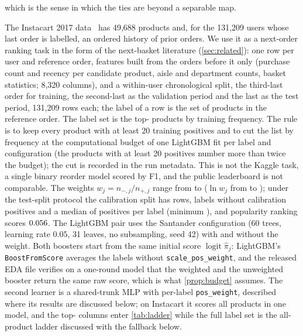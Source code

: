\documentclass[sigconf,nonacm]{acmart}
\begin{document}
which is the sense in which the ties are beyond a separable map.

The Instacart 2017 data~\cite{Instacart2017} has 49,688 products and, for the 131,209 users whose last order is labelled, an ordered history of prior orders. We use it as a next-order ranking task in the form of the next-basket literature (\cref{sec:related}): one row per user and reference order, features built from the orders before it only (purchase count and recency per candidate product, aisle and department counts, basket statistics; 8,320 columns), and a within-user chronological split, the third-last order for training, the second-last as the validation period and the last as the test period, 131,209 rows each; the label of a row is the set of products in the reference order. The label set is the top-\nInLabels{} products by training frequency. The rule is to keep every product with at least 20 training positives and to cut the list by frequency at the computational budget of one LightGBM fit per label and configuration (the products with at least 20 positives number more than twice the budget); the cut is recorded in the run metadata. This is not the Kaggle task, a single binary reorder model scored by F1, and the public leaderboard is not comparable.
The weights $w_j=n_{-,j}/n_{+,j}$ range from \nIwMin{} to \nIwMax{} ($\ln w_j$ from \nIlnwMin{} to \nIlnwMax); under the test-split protocol the calibration split has \nInVal{} rows, \nISnDead{} labels without calibration positives and a median of \nIcalPosMedAlive{} positives per label (minimum \nIcalPosMinAlive), and popularity ranking scores $0.056$. The LightGBM pair uses the Santander configuration (60 trees, learning rate $0.05$, 31 leaves, no subsampling, seed 42) with and without the weight. Both boosters start from the same initial score $\operatorname{logit}\hat\pi_j$: LightGBM's \texttt{BoostFromScore} averages the labels without \texttt{scale\_pos\_weight}, and the released EDA file verifies on a one-round model that the weighted and the unweighted booster return the same raw score, which is what \cref{prop:budget} assumes.
The second learner is a shared-trunk MLP with per-label \texttt{pos\_weight}, described where its results are discussed below; on Instacart it scores all \nIMAnLabels{} products in one model, and the top-\nInLabels{} columns enter \cref{tab:ladder} while the full label set is the all-product ladder discussed with the fallback below.
\end{document}
